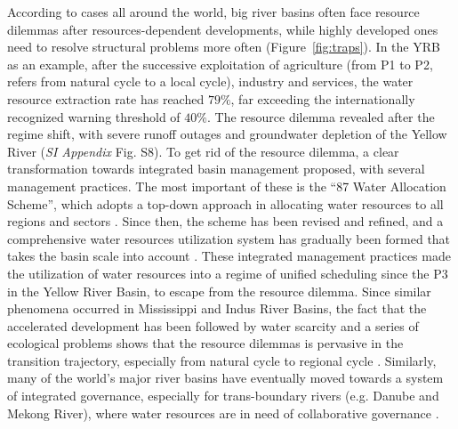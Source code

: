 \documentclass[9pt, twocolumn, twoside, lineno]{pnas-new}
\begin{document}
According to cases all around the world, big river basins often face resource dilemmas after resources-dependent developments, while highly developed ones need to resolve structural problems more often (Figure~\ref{fig:traps}).
In the YRB as an example, after the successive exploitation of agriculture (from P1 to P2, refers from natural cycle to a local cycle), industry and services, the water resource extraction rate has reached $79\%$, far exceeding the internationally recognized warning threshold of $40\%$. The resource dilemma revealed after the regime shift, with severe runoff outages and groundwater depletion of the Yellow River (\textit{SI Appendix} Fig. S8).
To get rid of the resource dilemma, a clear transformation towards integrated basin management proposed, with several management practices. 
The most important of these is the “87 Water Allocation Scheme”, which adopts a top-down approach in allocating water resources to all regions and sectors \cite{wangThirtyYearsYellow2018}. Since then, the scheme has been revised and refined, and a comprehensive water resources utilization system has gradually been formed that takes the basin scale into account \cite{wangThirtyYearsYellow2018}. 
These integrated management practices made the utilization of water resources into a regime of unified scheduling since the P3 in the Yellow River Basin, to escape from the resource dilemma. 
Since similar phenomena occurred in Mississippi and Indus River Basins, the fact that the accelerated development has been followed by water scarcity and a series of ecological problems shows that the resource dilemmas is pervasive in the transition trajectory, especially from natural cycle to regional cycle 
\cite{bestAnthropogenicStressesWorld2019,cummingResilienceBigRiver2011}.
Similarly, many of the world's major river basins have eventually moved towards a system of integrated governance, especially for trans-boundary rivers (e.g. Danube and Mekong River), where water resources are in need of collaborative governance \cite{bodinCollaborativeEnvironmentalGovernance2017,unep-dhiTransboundaryRiverBasins2016}.
\end{document}
